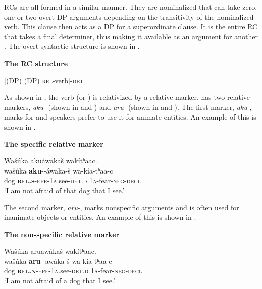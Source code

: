 \documentclass[output=paper]{LSP/langsci}
\begin{document}
 RCs are all formed in a similar manner. They are nominalized  that can take zero, one or two overt DP arguments depending on the transitivity of the nominalized verb. This clause then acts as a DP for a superordinate clause. It is the entire RC that takes a final determiner, thus making it available as an argument for another . The overt syntactic structure is shown in .

\ea \textbf{The  RC structure} \label{boyle6}

[(DP) (DP) \textsc{rel}-verb]-\textsc{det}
\z

As shown in , the verb (or ) is relativized by a relative marker.  has two relative markers, \textit{aku}- (shown in  and ) and \textit{aru}- (shown in  and ). The first marker, \textit{aku}-, marks for  and speakers prefer to use it for animate entities. An example of this is shown in .

\ea \textbf{The  specific relative marker} \label{boyle7}

\glll Wa\v{s}\'uka aku\'awaka\v{s} wak\'itʰaac.\\
wa\v{s}\'uka \textbf{aku}--\'awaka-\v{s}  wa-k\'ia-tʰaa-c\\
dog \textbf{\textsc{rel.s}}-\textsc{epe}-\textsc{1a}.see-\textsc{det.d} \textsc{1a}-fear-\textsc{neg-decl}\\
\trans `I am not afraid of that dog that I see.' 
\z

The second marker, \textit{aru}-, marks nonspecific arguments and is often used for inanimate objects or entities. An example of this is shown in .

\ea \textbf{The  non-specific relative marker} \label{boyle8}

\glll Wa\v{s}\'uka aruaw\'aka\v{s} wak\'itʰaac.\\
wa\v{s}\'uka \textbf{aru}--aw\'aka-\v{s}  wa-k\'ia-tʰaa-c\\
dog \textbf{\textsc{rel.n}}-\textsc{epe}-\textsc{1a}.see-\textsc{det.d} \textsc{1a}-fear-\textsc{neg-decl}\\
\trans `I am not afraid of a dog that I see.' 
\z
\end{document}
